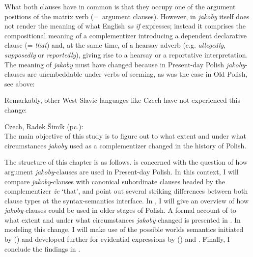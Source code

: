\documentclass[output=paper]{langsci/langscibook}
\begin{document}
What both clauses have in common is that they occupy one of the argument positions of the matrix verb (=~argument clauses). However, in  \emph{jakoby} itself does not render the meaning of what English \emph{as if} expresses; instead it comprises the compositional meaning of a complementizer introducing a dependent declarative clause (= \emph{that}) and, at the same time, of a hearsay adverb (e.g. \emph{allegedly}, \emph{supposedly} or \emph{reportedly}), giving rise to a hearsay or a reportative interpretation. The meaning of \emph{jakoby} must have changed because in Present-day Polish \emph{jakoby}-clauses are unembeddable under verbs of seeming, as was the case in Old Polish, see  above:


\z
Remarkably, other West-Slavic languages like Czech have not experienced this change:

\ea Czech, Radek Šimík (pc.):\\
\z\z
The main objective of this study is to figure out to what extent and under what circumstances \emph{jakoby} used as a complementizer changed in the history of Polish.

The structure of this chapter is as follows.  is concerned with the question of how argument \emph{jakoby}-clauses are used in Present-day Polish. In this context, I will compare \emph{jakoby}-clauses with canonical subordinate clauses headed by the complementizer \emph{że} `that', and point out several striking differences between both clause types at the syntax-semantics interface. In , I will give an overview of how \emph{jakoby}-clauses could be used in older stages of Polish. A formal account of to what extent and under what circumstances \emph{jakoby} changed is presented in . In modeling this change, I will make use of the possible worlds semantics initiated by \citeauthor{Kratzer1981} (\citeyear{Kratzer1981, Kratzer1991, Kratzer2012}) and developed further for evidential expressions by \citeauthor{Faller2002} (\citeyear{Faller2002, Faller2011}) and \textcite{Lisa-Matthewson-Davis2017}.  Finally, I conclude the findings in .
\end{document}
